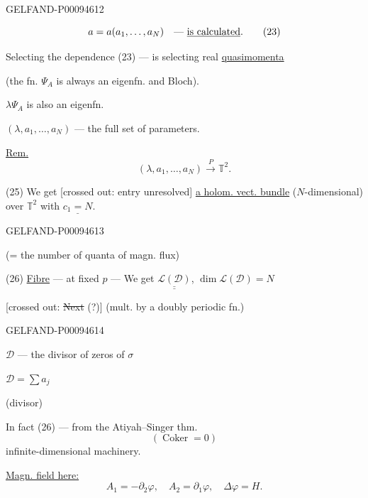 \begin{GelfandAdjacentEvidence}{GELFAND-P000946}{12}


\begin{equation*}
 a=a(a_1,\ldots,a_N)\quad\text{--- \underline{is calculated}}.
 \tag{23}
\end{equation*}

Selecting the dependence (23) --- is selecting real \underline{quasimomenta}

(the fn. $\Psi_A$ is always an eigenfn. and Bloch).

$\lambda\Psi_A$ is also an eigenfn.

$(\lambda,a_1,\ldots,a_N)$ --- the full set of parameters.

\underline{Rem.}
\begin{equation*}
 (\lambda,a_1,\ldots,a_N)\overset{P}{\longrightarrow}\mathbb T^2.
 \tag{24}
\end{equation*}

(25) We get [crossed out: entry unresolved] \underline{a holom. vect. bundle}
($N$-dimensional) over $\mathbb T^2$ with $\underline{c_1=N}$.
\end{GelfandAdjacentEvidence}
\begin{GelfandAdjacentEvidence}{GELFAND-P000946}{13}


(= the number of quanta of magn. flux)

(26) \underline{Fibre} --- at fixed $p$ --- We get
$\underline{\underline{\mathcal L(\mathcal D)}}$,
$\dim\mathcal L(\mathcal D)=N$

[crossed out: \sout{Next} (?)] (mult. by a doubly periodic fn.)
\end{GelfandAdjacentEvidence}
\begin{GelfandAdjacentEvidence}{GELFAND-P000946}{14}


$\mathcal D$ --- the divisor of zeros of $\sigma$\par
$\mathcal D=\sum a_j$\par
(divisor)
\end{GelfandAdjacentEvidence}


In fact (26) --- from the Atiyah–Singer thm.
\[
 (\operatorname{Coker}=0)
\]
infinite-dimensional machinery.

\underline{Magn. field here:}
\begin{equation*}
 A_1=-\partial_2\varphi,\quad A_2=\partial_1\varphi,\quad\Delta\varphi=H.
 \tag{27}
\end{equation*}


